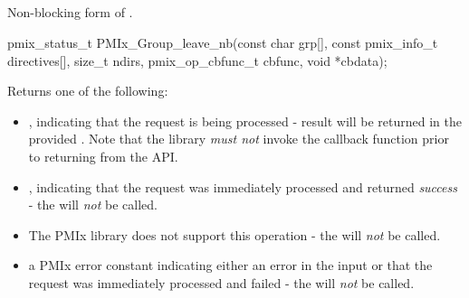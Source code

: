 \subsection{}

\summary

Non-blocking form of .

\format

\cspecificstart
\begin{codepar}
pmix_status_t
PMIx_Group_leave_nb(const char grp[],
                    const pmix_info_t directives[],
                    size_t ndirs,
                    pmix_op_cbfunc_t cbfunc,
                    void *cbdata);
\end{codepar}
\cspecificend

\begin{arglist}
\end{arglist}

Returns one of the following:

\begin{itemize}
    \item {}, indicating that the request is being processed - result will be returned in the provided . Note that the library \emph{must not} invoke the callback function prior to returning from the \ac{API}.
    \item {}, indicating that the request was immediately processed and returned \textit{success} - the  will \textit{not} be called.
    \item {} The \ac{PMIx} library does not support this operation - the  will \textit{not} be called.
    \item a PMIx error constant indicating either an error in the input or that the request was immediately processed and failed - the  will \textit{not} be called.
\end{itemize}

